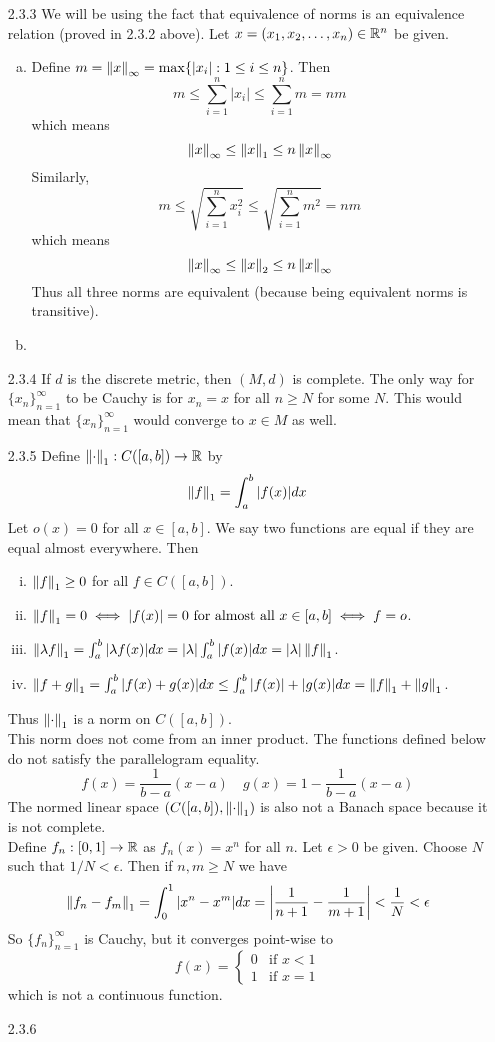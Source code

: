 \documentclass[../../Solutions.tex]{subfiles}
\begin{document}
\begin{itemize}
	\item [2.3.3] We will be using the fact that equivalence of norms is an equivalence relation (proved in 2.3.2 above).
		Let $x = (x_1,x_2,\dots,x_n) \in \mathbb{R}^n$ be given.
		\begin{enumerate}[(a)]
			\item Define $m = \left\lVert x\right\rVert_\infty = \max\{|x_i| : 1 \leq i \leq n\}$.
				Then
				$$ m \leq \sum_{i=1}^n |x_i| \leq \sum_{i=1}^n m = n m $$
				which means
				$$ \left\lVert x\right\rVert_\infty \leq \left\lVert x\right\rVert_1 \leq n\left\lVert x\right\rVert_\infty $$
				Similarly,
				$$ m \leq \sqrt{\sum_{i=1}^n x_i^2} \leq \sqrt{\sum_{i=1}^n m^2} = n m $$
				which means
				$$ \left\lVert x\right\rVert_\infty \leq \left\lVert x\right\rVert_2 \leq n\left\lVert x\right\rVert_\infty $$
				Thus all three norms are equivalent (because being equivalent norms is transitive).
			\item %
		\end{enumerate}
	
	\item [2.3.4] If $d$ is the discrete metric, then $(M,d)$ is complete.
		The only way for $\{x_n\}_{n=1}^\infty$ to be Cauchy is for $x_n = x$ for all $n \geq N$ for some $N$.
		This would mean that $\{x_n\}_{n=1}^\infty$ would converge to $x \in M$ as well.
	
	\item [2.3.5] Define $\left\lVert\cdot\right\rVert_1 : C([a,b]) \to \mathbb{R}$ by
		$$ \left\lVert f\right\rVert_1 = \int_a^b |f(x)| dx $$
		Let $o(x) = 0$ for all $x \in [a,b]$.
		We say two functions are equal if they are equal almost everywhere.
		Then
		\begin{enumerate}[(i)]
			\item $\left\lVert f\right\rVert_1 \geq 0$ for all $f \in C([a,b])$.
			\item $\left\lVert f\right\rVert_1 = 0 \iff |f(x)| = 0 \text{ for almost all } x \in [a,b] \iff f = o$.
			\item $\left\lVert\lambda f\right\rVert_1 = \int_a^b |\lambda f(x)| dx = |\lambda|\int_a^b|f(x)|dx = |\lambda|\left\lVert f\right\rVert_1$.
			\item $\left\lVert f+g\right\rVert_1 = \int_a^b |f(x)+g(x)|dx \leq \int_a^b|f(x)|+|g(x)|dx = \left\lVert f\right\rVert_1+\left\lVert g\right\rVert_1$.
		\end{enumerate}
		Thus $\left\lVert\cdot\right\rVert_1$ is a norm on $C([a,b])$. \\
		This norm does not come from an inner product.
		The functions defined below do not satisfy the parallelogram equality.
		$$ f(x) = \frac{1}{b-a}(x-a) \quad g(x) = 1-\frac{1}{b-a}(x-a) $$
		The normed linear space $(C([a,b]),\left\lVert\cdot\right\rVert_1)$ is also not a Banach space because it is not complete. \\
		Define $f_n:[0,1] \to \mathbb{R}$ as $f_n(x) = x^n$ for all $n$.
		Let $\epsilon > 0$ be given.
		Choose $N$ such that $1/N < \epsilon$.
		Then if $n,m \geq N$ we have
		$$ \left\lVert f_n-f_m\right\rVert_1 = \int_0^1|x^n-x^m|dx = \left|\frac{1}{n+1}-\frac{1}{m+1}\right| < \frac{1}{N} < \epsilon $$
		So $\{f_n\}_{n=1}^\infty$ is Cauchy, but it converges point-wise to
		$$ f(x) = \begin{cases}
			0 & \text{if } x < 1 \\
			1 & \text{if } x = 1
		\end{cases} $$
		which is not a continuous function.
	
	\item [2.3.6]
	
\end{itemize}
\end{document}
